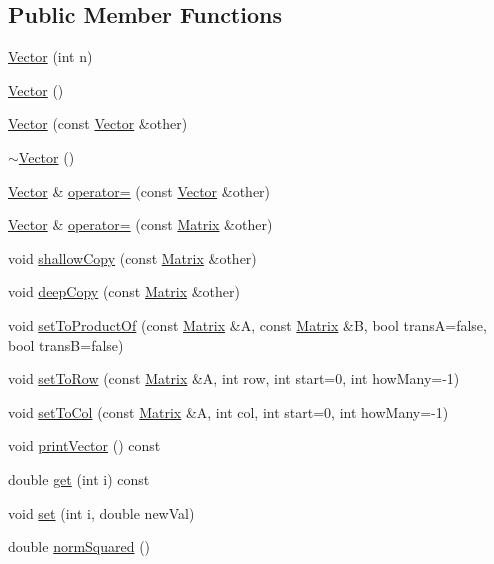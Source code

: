 \subsection*{Public Member Functions}
\begin{DoxyCompactItemize}
\item 
\hyperlink{classCartWheel_1_1Math_1_1Vector_a96908fb25f0e8236d25650847ee504d5}{Vector} (int n)
\item 
\hyperlink{classCartWheel_1_1Math_1_1Vector_a6f80c73b5f18dcf3f8e36065bdc8b9e5}{Vector} ()
\item 
\hyperlink{classCartWheel_1_1Math_1_1Vector_a4ec1206fa568aa953588ef663ff511be}{Vector} (const \hyperlink{classCartWheel_1_1Math_1_1Vector}{Vector} \&other)
\item 
\hyperlink{classCartWheel_1_1Math_1_1Vector_a2eb3c49587a4f12cade7895ccb73f6a0}{$\sim$Vector} ()
\item 
\hyperlink{classCartWheel_1_1Math_1_1Vector}{Vector} \& \hyperlink{classCartWheel_1_1Math_1_1Vector_a31810b59e0d9106aa17ecf6ae1cfbaf1}{operator=} (const \hyperlink{classCartWheel_1_1Math_1_1Vector}{Vector} \&other)
\item 
\hyperlink{classCartWheel_1_1Math_1_1Vector}{Vector} \& \hyperlink{classCartWheel_1_1Math_1_1Vector_a1ec609f24d97d79e99b6bfc8759863e1}{operator=} (const \hyperlink{classCartWheel_1_1Math_1_1Matrix}{Matrix} \&other)
\item 
void \hyperlink{classCartWheel_1_1Math_1_1Vector_a8a80f871c2514f51041a4c960659c53a}{shallowCopy} (const \hyperlink{classCartWheel_1_1Math_1_1Matrix}{Matrix} \&other)
\item 
void \hyperlink{classCartWheel_1_1Math_1_1Vector_aecfcd019a564ab7b9f71e2585de515f6}{deepCopy} (const \hyperlink{classCartWheel_1_1Math_1_1Matrix}{Matrix} \&other)
\item 
void \hyperlink{classCartWheel_1_1Math_1_1Vector_a3c20feee35a90b2b4da394d7851a0437}{setToProductOf} (const \hyperlink{classCartWheel_1_1Math_1_1Matrix}{Matrix} \&A, const \hyperlink{classCartWheel_1_1Math_1_1Matrix}{Matrix} \&B, bool transA=false, bool transB=false)
\item 
void \hyperlink{classCartWheel_1_1Math_1_1Vector_acbfd79aa84ad65acabe6ef03f0329e7c}{setToRow} (const \hyperlink{classCartWheel_1_1Math_1_1Matrix}{Matrix} \&A, int row, int start=0, int howMany=-\/1)
\item 
void \hyperlink{classCartWheel_1_1Math_1_1Vector_ae98317a1a169070e52436ed4b6c62c5c}{setToCol} (const \hyperlink{classCartWheel_1_1Math_1_1Matrix}{Matrix} \&A, int col, int start=0, int howMany=-\/1)
\item 
void \hyperlink{classCartWheel_1_1Math_1_1Vector_a1e60f4c06eaee149416365e2a85bc150}{printVector} () const 
\item 
double \hyperlink{classCartWheel_1_1Math_1_1Vector_a029056849abdef56a0858d4753cd8274}{get} (int i) const 
\item 
void \hyperlink{classCartWheel_1_1Math_1_1Vector_abb08d9034a1ae962d4bedff66799bf3b}{set} (int i, double newVal)
\item 
double \hyperlink{classCartWheel_1_1Math_1_1Vector_aa5d753fb504bac7f71960daf1ae85f13}{normSquared} ()
\end{DoxyCompactItemize}


